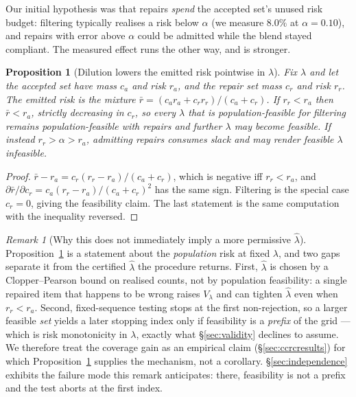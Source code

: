 \documentclass[review,number,doubleblind]{elsarticle}
\theoremstyle{plain}
\newtheorem{proposition}{Proposition}
\theoremstyle{definition}
\theoremstyle{remark}
\newtheorem{remark}{Remark}
\begin{document}
Our initial hypothesis was that repairs \emph{spend} the accepted set's unused risk budget:
filtering typically realises a risk below $\alpha$ (we measure $8.0\%$ at $\alpha=0.10$),
and repairs with error above $\alpha$ could be admitted while the blend stayed compliant.
The measured effect runs the other way, and is stronger.

\begin{proposition}[Dilution lowers the emitted risk pointwise in $\lambda$]
\label{prop:dilution}
Fix $\lambda$ and let the accepted set have mass $c_a$ and risk $r_a$, and the repair set
mass $c_r$ and risk $r_r$. The emitted risk is the mixture
$\bar r=(c_ar_a+c_rr_r)/(c_a+c_r)$. If $r_r<r_a$ then $\bar r<r_a$, strictly decreasing in
$c_r$, so every $\lambda$ that is population-feasible for filtering remains
population-feasible with repairs and further $\lambda$ may become feasible. If instead
$r_r>\alpha>r_a$, admitting repairs consumes slack and may render feasible $\lambda$
infeasible.
\end{proposition}

\begin{proof}
$\bar r-r_a=c_r(r_r-r_a)/(c_a+c_r)$, which is negative iff $r_r<r_a$, and
$\partial\bar r/\partial c_r=c_a(r_r-r_a)/(c_a+c_r)^2$ has the same sign. Filtering is the
special case $c_r=0$, giving the feasibility claim. The last statement is the same
computation with the inequality reversed.
\end{proof}

\begin{remark}[Why this does not immediately imply a more permissive $\hat\lambda$]
\label{rem:prefix}
Proposition~\ref{prop:dilution} is a statement about the \emph{population} risk at fixed
$\lambda$, and two gaps separate it from the certified $\hat\lambda$ the procedure returns.
First, $\hat\lambda$ is chosen by a Clopper--Pearson bound on realised counts, not by
population feasibility: a single repaired item that happens to be wrong raises $V_\lambda$
and can tighten $\hat\lambda$ even when $r_r<r_a$. Second, fixed-sequence testing stops at
the first non-rejection, so a larger feasible \emph{set} yields a later stopping index only
if feasibility is a \emph{prefix} of the grid --- which is risk monotonicity in $\lambda$,
exactly what \S\ref{sec:validity} declines to assume. We therefore treat the coverage gain
as an empirical claim (\S\ref{sec:ccrcresults}) for which Proposition~\ref{prop:dilution}
supplies the mechanism, not a corollary. \S\ref{sec:independence} exhibits the failure mode
this remark anticipates: there, feasibility is not a prefix and the test aborts at the first
index.
\end{remark}
\end{document}
